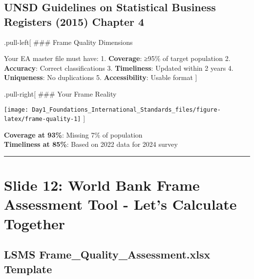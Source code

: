 \documentclass[
]{article}
\begin{document}
\subsection{UNSD Guidelines on Statistical Business Registers (2015)
Chapter
4}\label{unsd-guidelines-on-statistical-business-registers-2015-chapter-4}

.pull-left{[} \#\#\# Frame Quality Dimensions

Your EA master file must have: 1. \textbf{Coverage}: ≥95\% of target
population 2. \textbf{Accuracy}: Correct classifications 3.
\textbf{Timeliness}: Updated within 2 years 4. \textbf{Uniqueness}: No
duplications 5. \textbf{Accessibility}: Usable format {]}

.pull-right{[} \#\#\# Your Frame Reality

\texttt{[image: Day1\_Foundations\_International\_Standards\_files/figure-latex/frame-quality-1]}
{]}

\textbf{Coverage at 93\%}: Missing 7\% of population\\
\textbf{Timeliness at 85\%}: Based on 2022 data for 2024 survey

\begin{center}\rule{0.5\linewidth}{0.5pt}\end{center}

\section{Slide 12: World Bank Frame Assessment Tool - Let's Calculate
Together}\label{slide-12-world-bank-frame-assessment-tool---lets-calculate-together}

\subsection{LSMS Frame\_Quality\_Assessment.xlsx
Template}\label{lsms-frame_quality_assessment.xlsx-template}
\end{document}
